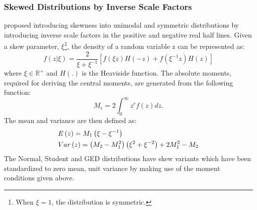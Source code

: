 \subsubsection{Skewed Distributions by Inverse Scale Factors}\label{skewdist}
\citet{Fernandez1} proposed introducing skewness into unimodal and symmetric
distributions by introducing inverse scale factors in the positive and negative
real half lines. Given a skew parameter, $\xi$\footnote{When $\xi=1$, the
distribution is symmetric.}, the density of a random variable z can be
represented as:
\begin{equation}\label{eq:skew1}
f\left( {z|\xi } \right) = \frac{2}
{{\xi  + {\xi ^{ - 1}}}}\left[ {f\left( {\xi z} \right)H\left( { - z} \right) + f\left( {{\xi ^{ - 1}}z} \right)H\left( z \right)} \right]
\end{equation}
where $\xi  \in {\mathbb{R}^ + }$ and $H(.)$ is the Heaviside function. The
absolute moments, required for deriving the central moments, are generated from
the following function:
\begin{equation}\label{eq:skew2}
{M_r} = 2\int_0^\infty  {{z^r}f\left( z \right)dz}.
\end{equation}
The mean and variance are then defined as:
\begin{equation}\label{eq:skew3}
\begin{gathered}
  E\left( z \right) = {M_1}\left( {\xi  - {\xi ^{ - 1}}} \right) \hfill \\
  Var\left( z \right) = \left( {{M_2} - M_1^2} \right)\left( {{\xi ^2} + {\xi ^{ - 2}}} \right) + 2M_1^2 - {M_2} \hfill \\
\end{gathered}
\end{equation}
The Normal, Student and GED distributions have skew variants which have been
standardized to zero mean, unit variance by making use of the moment conditions
given above.

